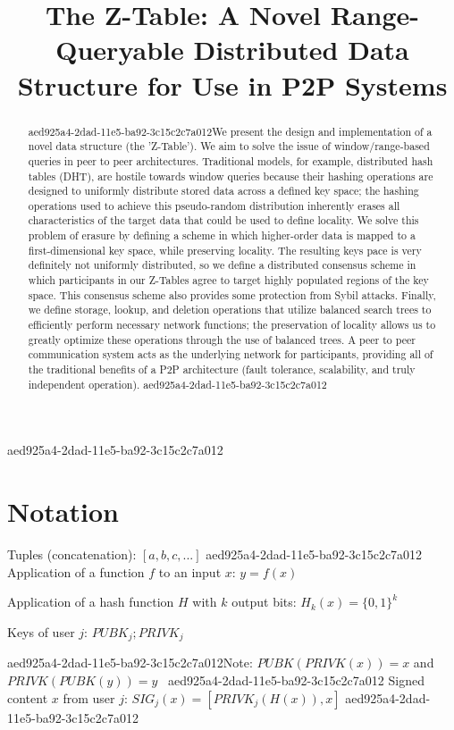\documentclass[12pt]{article}
\title{The Z-Table: A Novel Range-Queryable Distributed Data Structure for Use in P2P Systems}
\begin{document}
aed925a4-2dad-11e5-ba92-3c15c2c7a012\maketitle

\begin{abstract}
aed925a4-2dad-11e5-ba92-3c15c2c7a012We present the design and implementation of a novel data structure (the 'Z-Table'). We aim to solve the issue of window/range-based queries in peer to peer architectures. Traditional models, for example,  distributed hash tables (DHT), are hostile towards window queries because their hashing operations are designed to uniformly distribute stored data across a defined key space; the hashing operations used to achieve this pseudo-random distribution inherently erases all characteristics of the target data that could be used to define locality. We solve this problem of erasure by defining a scheme in which higher-order data is mapped to a first-dimensional key space, while preserving locality. The resulting keys pace is very definitely not uniformly distributed, so we define a distributed consensus scheme in which participants in our Z-Tables agree to target highly populated regions of the key space. This consensus scheme also provides some protection from Sybil attacks. Finally, we define storage, lookup, and deletion operations that utilize balanced search trees to efficiently perform necessary network functions; the preservation of locality allows us to greatly optimize these operations through the use of balanced trees. A peer to peer communication system acts as the underlying network for participants, providing all of the traditional benefits of a P2P architecture (fault tolerance, scalability, and truly independent operation).
aed925a4-2dad-11e5-ba92-3c15c2c7a012\end{abstract}

\section{Notation}

Tuples (concatenation): $[a,b,c,...]$
aed925a4-2dad-11e5-ba92-3c15c2c7a012
Application of a function $f$ to an input $x$: $y=f(x)$

Application of a hash function $H$ with $k$ output bits: $H_{k}(x) = \{0,1\}^k$

Keys of user $j$: $ PUBK_j; PRIVK_j $

aed925a4-2dad-11e5-ba92-3c15c2c7a012Note: $PUBK(PRIVK(x)) = x$ and $PRIVK(PUBK(y)) = y$~
aed925a4-2dad-11e5-ba92-3c15c2c7a012
Signed content $x$ from user $j$: $SIG_j(x) = \left[ PRIVK_j( H(x) ), x \right]$
aed925a4-2dad-11e5-ba92-3c15c2c7a012
\end{document}
